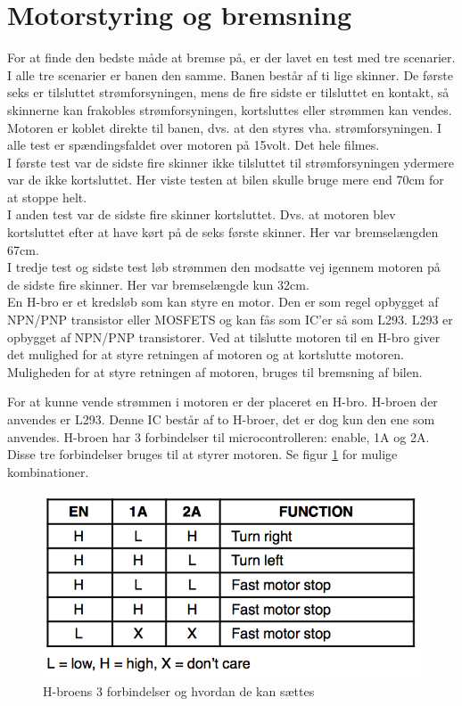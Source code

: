 \section{Motorstyring og bremsning}
For at finde den bedste måde at bremse på, er der lavet en test med tre scenarier. I alle tre scenarier er banen den samme. Banen består af ti lige skinner. De første seks er tilsluttet strømforsyningen, mens de fire sidste er tilsluttet en kontakt, så skinnerne kan frakobles strømforsyningen, kortsluttes eller strømmen kan vendes. Motoren er koblet direkte til banen, dvs. at den styres vha. strømforsyningen. I alle test er spændingsfaldet over motoren på 15volt. Det hele filmes. \\

I første test var de sidste fire skinner ikke tilsluttet til strømforsyningen ydermere var de ikke kortsluttet. Her viste testen at bilen skulle bruge mere end 70cm for at stoppe helt. \\
I anden test var de sidste fire skinner kortsluttet. Dvs. at motoren blev kortsluttet efter at have kørt på de seks første skinner. Her var bremselængden 67cm. \\
I tredje test og sidste test løb strømmen den modsatte vej igennem motoren på de sidste fire skinner. Her var bremselængde kun 32cm. \\

En H-bro er et kredsløb som kan styre en motor. Den er som regel opbygget af NPN/PNP transistor eller MOSFETS og kan fås som IC'er så som L293. L293 er opbygget af NPN/PNP transistorer. Ved at tilslutte motoren til en H-bro giver det mulighed for at styre retningen af motoren og at kortslutte motoren. Muligheden for at styre retningen af motoren, bruges til bremsning af bilen.

For at kunne vende strømmen i motoren er der placeret en H-bro. H-broen der anvendes er L293. Denne IC består af to H-broer, det er dog kun den ene som anvendes. H-broen har 3 forbindelser til microcontrolleren: enable, 1A og 2A. Disse tre forbindelser bruges til at styrer motoren. Se figur \ref{hbro_forbindelse} for mulige kombinationer. 

\begin{figure}[h!]
\center
\includegraphics[scale=0.35]{./Graphics/h-bro_forbindelse.png}
\caption{H-broens 3 forbindelser og hvordan de kan sættes}
\label{hbro_forbindelse}
\end{figure}

